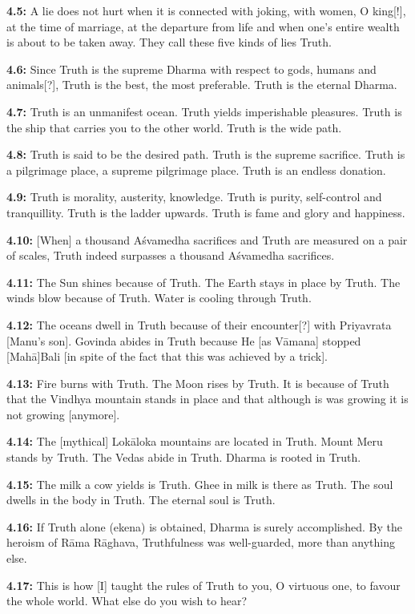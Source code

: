 \documentclass{article}
\newcommand{\vsnum}[1]{\textbf{#1}}
\begin{document}
\vsnum{4.5: }A lie does not hurt when it is connected with joking, with women, O king[!], at the time of marriage, at the departure from life and when one's entire wealth is about to be taken away. They call these five kinds of lies Truth.

\vsnum{4.6: }Since Truth is the supreme Dharma with respect to gods, humans and animals[?], Truth is the best, the most preferable. Truth is the eternal Dharma.

\vsnum{4.7: }Truth is an unmanifest ocean. Truth yields imperishable pleasures. Truth is the ship that carries you to the other world. Truth is the wide path.

\vsnum{4.8: }Truth is said to be the desired path. Truth is the supreme sacrifice. Truth is a pilgrimage place, a supreme pilgrimage place. Truth is an endless donation.

\vsnum{4.9: }Truth is morality, austerity, knowledge. Truth is purity, self-control and tranquillity. Truth is the ladder upwards. Truth is fame and glory and happiness.

\vsnum{4.10: }[When] a thousand Aśvamedha sacrifices and Truth are measured on a pair of scales, Truth indeed surpasses a thousand Aśvamedha sacrifices.

\vsnum{4.11: }The Sun shines because of Truth. The Earth stays in place by Truth. The winds blow because of Truth. Water is cooling through Truth.

\vsnum{4.12: }The oceans dwell in Truth because of their encounter[?] with Priyavrata [Manu's son]. Govinda abides in Truth because He [as Vāmana] stopped [Mahā]Bali [in spite of the fact that this was achieved by a trick].

\vsnum{4.13: }Fire burns with Truth. The Moon rises by Truth. It is because of Truth that the Vindhya mountain stands in place and that although is was growing it is not growing [anymore].

\vsnum{4.14: }The [mythical] Lokāloka mountains are located in Truth. Mount Meru stands by Truth. The Vedas abide in Truth. Dharma is rooted in Truth.

\vsnum{4.15: }The milk a cow yields is Truth. Ghee in milk is there as Truth. The soul dwells in the body in Truth. The eternal soul is Truth.

\vsnum{4.16: } If Truth alone (ekena) is obtained, Dharma is surely accomplished. By the heroism of Rāma Rāghava, Truthfulness was well-guarded, more than anything else.

\vsnum{4.17: }This is how [I] taught the rules of Truth to you, O virtuous one, to favour the whole world. What else do you wish to hear?
\end{document}
